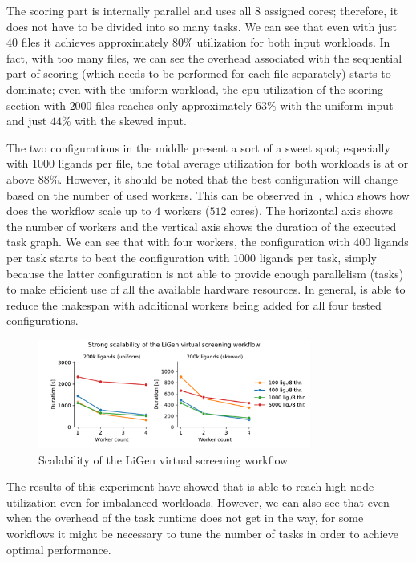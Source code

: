 The scoring part is internally parallel and uses all $8$ assigned cores;
therefore, it does not have to be divided into so many tasks. We can see that even with just
$40$ files it achieves approximately $80\%$ utilization for
both input workloads. In fact, with too many files, we can see the overhead associated with the
sequential part of scoring (which needs to be performed for each file separately) starts to
dominate; even with the uniform workload, the \gls{cpu} utilization of the scoring
section with $2000$ files reaches only approximately $63\%$ with
the uniform input and just $44\%$ with the skewed input.

The two configurations in the middle present a sort of a sweet spot; especially with
$1000$ ligands per file, the total average utilization for both workloads is at or
above $88\%$. However, it should be noted that the best configuration will change
based on the number of used workers. This can be observed in~, which shows
how does the workflow scale up to $4$ workers ($512$ cores).
The horizontal axis shows the number of workers and the vertical axis shows the duration of the
executed task graph. We can see that with four workers, the configuration with
$400$ ligands per task starts to beat the configuration with
$1000$ ligands per task, simply because the latter configuration is not able to
provide enough parallelism (tasks) to make efficient use of all the available hardware resources.
In general, \hyperqueue{} is able to reduce the makespan with additional workers being
added for all four tested configurations.

\begin{figure}[h]
	\centering
	\includegraphics[width=0.8\textwidth]{imgs/hq/charts/ligen-aggregation-scalability}
	\caption{Scalability of the LiGen virtual screening workflow}
	\label{fig:hq-ligen-scalability}
\end{figure}

The results of this experiment have showed that \hyperqueue{} is able to reach high node
utilization even for imbalanced workloads. However, we can also see that even when the overhead of
the task runtime does not get in the way, for some workflows it might be necessary to tune the
number of tasks in order to achieve optimal performance.

